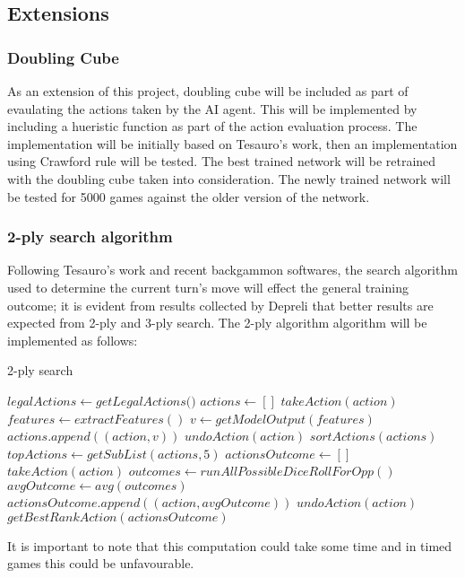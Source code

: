 \documentclass[12pt,a4paper]{article}
\begin{document}
\subsection{Extensions}
\subsubsection{Doubling Cube}
As an extension of this project, doubling cube will be included as part of evaulating the actions taken by the AI agent. This will be implemented by including a hueristic function as part of the action evaluation process. The implementation will be initially based on Tesauro's \citeyear{DBLP:journals/ai/Tesauro02} work, then an implementation using Crawford rule will be tested. The best trained network will be retrained with the doubling cube taken into consideration. The newly trained network will be tested for 5000 games against the older version of the network. 

\subsubsection{2-ply search algorithm}
Following Tesauro's \citeyear{DBLP:journals/ai/Tesauro02} work and recent backgammon softwares, the search algorithm used to determine the current turn's move will effect the general training outcome; it is evident from results collected by Depreli \citeyear{botbattle} that better results are expected from 2-ply and 3-ply search. The 2-ply algorithm algorithm will be implemented as follows:

\begin{algorithm}
    \caption{2-ply search}\label{euclid}
    \begin{algorithmic}[1]
    \State $legalActions \gets \textit{getLegalActions()}$
    \State $actions \gets []$
    \State $\textit{takeAction}(action)$
    \State $features \gets \textit{extractFeatures}()$
    \State $v \gets \textit{getModelOutput}(features)$ 
    \State $actions.\textit{append}((action,v))$
    \State $\textit{undoAction}(action)$
    \EndFor
    \State $\textit{sortActions}(actions)$ 
    \State $topActions \gets \textit{getSubList}(actions, 5)$ 
    \State $actionsOutcome \gets []$
    \State $\textit{takeAction}(action)$
    \State $outcomes \gets \textit{runAllPossibleDiceRollForOpp}()$ 
    \State $avgOutcome \gets \textit{avg}(outcomes)$
    \State $actionsOutcome.\textit{append}((action, avgOutcome))$
    \State $\textit{undoAction}(action)$
    \EndFor
    \Return $\textit{getBestRankAction}(actionsOutcome)$ 
    \end{algorithmic}
\end{algorithm}

It is important to note that this computation could take some time and in timed games this could be unfavourable. 


\end{document}
